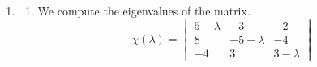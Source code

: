 {\begin{Solution}
\begin{enumerate}
\begin{enumerate}
\begin{gather*}
\begin{pmatrix}
        \end{pmatrix}
        \begin{pmatrix}
          \zeta_1 \\
          0 \\
          \zeta_3
        \end{pmatrix}
        =
        \begin{pmatrix}
          1 \\
          0 \\
          1
        \end{pmatrix} \\
        - \zeta_1 + \zeta_3 = 1, \quad 2 \zeta_1 - \zeta_3 = 0, \quad -3 \zeta_1 + 2 \zeta_3 = 1 \\
        \boldsymbol{\zeta} = 
        \begin{pmatrix}
          1 \\
          0 \\
          2
        \end{pmatrix}
      \end{gather*}
      A third linearly independent solution is
      \[
      \boxed{
        \mathbf{x}^{(3)} =   
        \begin{pmatrix}
          0 \\
          1 \\
          -1
        \end{pmatrix}
        (t^2/2) \e^{2 t} + 
        \begin{pmatrix}
          1 \\
          0 \\
          1
        \end{pmatrix}
        t \e^{2 t} +
        \begin{pmatrix}
          1 \\
          0 \\
          2
        \end{pmatrix}
        \e^{2 t}
        }
      \]
    \end{enumerate}
  \item
    \begin{enumerate}
    \item
      We compute the eigenvalues of the matrix.
      \[
      \chi(\lambda) = \begin{vmatrix}
        5 - \lambda & -3 & -2 \\
        8 & -5 - \lambda & -4 \\
        -4 & 3 & 3 - \lambda

\end{vmatrix}\]
\end{enumerate}
\end{enumerate}
\end{Solution}}
